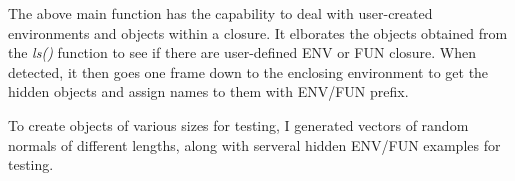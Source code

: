 \documentclass{article}
\begin{document}
\newpage

\newpage

The above main function has the capability to deal with user-created environments and objects within a closure.
It elborates the objects obtained from the \textit{ls()} function to see if there are user-defined ENV or FUN closure.
When detected, it then goes one frame down to the enclosing environment to get the hidden objects and assign names to
them with ENV/FUN prefix.


To create objects of various sizes for testing, I generated vectors of random normals of different lengths, 
along with serveral hidden ENV/FUN examples for testing.
\end{document}
